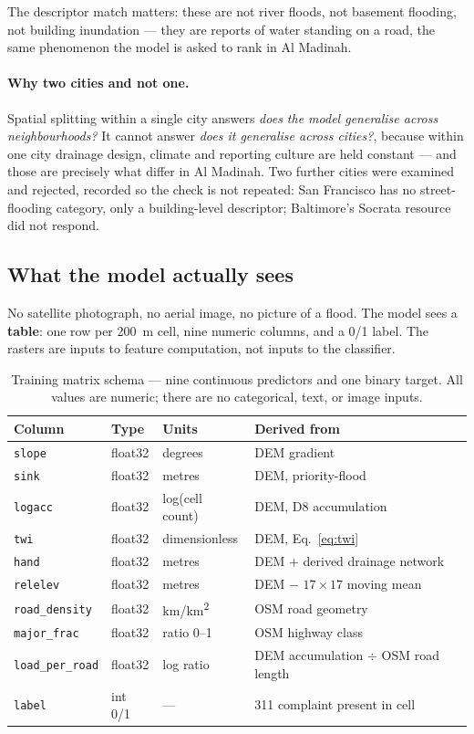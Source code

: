 \documentclass[11pt,a4paper]{article}
\newcommand{\ttt}[1]{\texttt{#1}}
\begin{document}
The descriptor match matters: these are not river floods, not basement flooding, not
building inundation --- they are reports of water standing on a road, the same phenomenon
the model is asked to rank in Al Madinah.

\paragraph{Why two cities and not one.}
Spatial splitting within a single city answers \emph{does the model generalise across
neighbourhoods?} It cannot answer \emph{does it generalise across cities?}, because
within one city drainage design, climate and reporting culture are held constant --- and
those are precisely what differ in Al Madinah. Two further cities were examined and
rejected, recorded so the check is not repeated: San Francisco has no street-flooding
category, only a building-level descriptor; Baltimore's Socrata resource did not respond.

\subsection{What the model actually sees}

\begin{notebox}
No satellite photograph, no aerial image, no picture of a flood. The model sees a
\textbf{table}: one row per \SI{200}{\metre} cell, nine numeric columns, and a 0/1 label.
The rasters are inputs to feature computation, not inputs to the classifier.
\end{notebox}

\begin{table}[htbp]\centering\small
\caption{Training matrix schema --- nine continuous predictors and one binary target.
All values are numeric; there are no categorical, text, or image inputs.}\label{tab:schema}
\begin{tabular}{@{}llll@{}}
\toprule
Column & Type & Units & Derived from\\
\midrule
\ttt{slope} & float32 & degrees & DEM gradient\\
\ttt{sink} & float32 & metres & DEM, priority-flood\\
\ttt{logacc} & float32 & log(cell count) & DEM, D8 accumulation\\
\ttt{twi} & float32 & dimensionless & DEM, Eq.~\eqref{eq:twi}\\
\ttt{hand} & float32 & metres & DEM + derived drainage network\\
\ttt{relelev} & float32 & metres & DEM $-$ $17\times17$ moving mean\\
\ttt{road\_density} & float32 & km/km\textsuperscript{2} & OSM road geometry\\
\ttt{major\_frac} & float32 & ratio 0--1 & OSM highway class\\
\ttt{load\_per\_road} & float32 & log ratio & DEM accumulation $\div$ OSM road length\\
\midrule
\rowcolor{rowtint}
\ttt{label} & int 0/1 & --- & 311 complaint present in cell\\
\bottomrule
\end{tabular}
\end{table}
\end{document}
